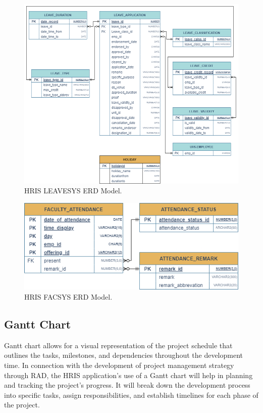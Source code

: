     \begin{figure}[H]
        \centering
        \includegraphics[width=1\linewidth]{figures/images/erd-leavesys.png}
        \caption{HRIS LEAVESYS ERD Model.}
        \label{fig:erd-leavesys}
    \end{figure}

    \begin{figure}[H]
        \centering
        \includegraphics[width=1\linewidth]{figures/images/erd-facsys.png}
        \caption{HRIS FACSYS ERD Model.}
        \label{fig:erd-facsys}
    \end{figure}
    
    \subsection{Gantt Chart}
    
    Gantt chart allows for a visual representation of the project schedule that outlines the tasks, milestones, and dependencies throughout the development time. In connection with the development of project management strategy through RAD, the HRIS application's use of a Gantt chart will help in planning and tracking the project's progress. It will break down the development process into specific tasks, assign responsibilities, and establish timelines for each phase of the project.
    
